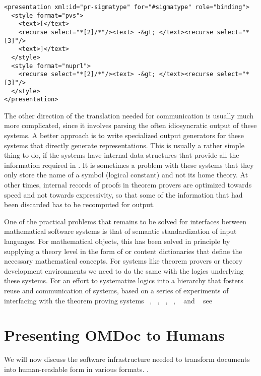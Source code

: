 \begin{omgroup}[id=transform-xsl,short=Transforming OMDoc]
\begin{lstlisting}[label=lst:system-language,
  caption={A {\element{symbol}} in a Language Definition Theory},
  index={symbol,presentation,style}]
<presentation xml:id="pr-sigmatype" for="#sigmatype" role="binding">
  <style format="pvs">
    <text>[</text>
    <recurse select="*[2]/*"/><text> -&gt; </text><recurse select="*[3]"/>
    <text>]</text>
  </style>
  <style format="nuprl">
    <recurse select="*[2]/*"/><text> -&gt; </text><recurse select="*[3]"/>
  </style>
</presentation>
\end{lstlisting}

The other direction of the translation needed for communication is usually much
more complicated, since it involves parsing the often idiosyncratic output of
these systems. A better approach is to write specialized output generators for
these systems that directly generate {\omdoc} representations. This is usually a
rather simple thing to do, if the systems have internal data structures that
provide all the information required in {\omdoc}. It is sometimes a problem with
these systems that they only store the name of a symbol (logical constant) and not
its home theory. At other times, internal records of proofs in theorem provers are
optimized towards speed and not towards expressivity, so that some of the
information that had been discarded has to be recomputed for {\omdoc} output.

One of the practical problems that remains to be solved for interfaces between
mathematical software systems is that of semantic standardization of input
languages. For mathematical objects, this has been solved in principle by supplying a
theory level in the form of {\openmath} or {\omdoc} content dictionaries that define the
necessary mathematical concepts. For systems like theorem provers or theory development
environments we need to do the same with the logics underlying these systems. For an
effort to systematize logics into a hierarchy that fosters reuse and communication of
systems, based on a series of experiments of interfacing with the theorem proving systems
{\OMEGA}~\cite{BenzmuellerEtAl:otama97}, {\inka}~\cite{HuSe:itng96}, {\pvs}~\cite{OwRu92},
{\lambdaclam}~\cite{RicSmaGre:ppihol98}, {\tps}~\cite{AnBi:tatps96} and
{\coq}~\cite{CoqManual} see {}


\section{Presenting OMDoc to Humans}\label{sec:omdoc2pres}

We will now discuss the software infrastructure needed to transform {\omdoc} documents
into human-readable form in various formats. .


\end{omgroup}
